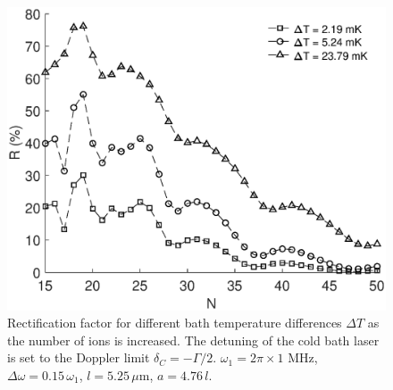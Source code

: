 \begin{figure}
    \includegraphics[width=\linewidth]{Figures/Changing_N.eps}
    \caption{Rectification factor for different bath temperature differences $\Delta T$ as the number of ions is increased. The detuning of the cold bath laser is set to the Doppler limit $\delta_C = - \Gamma / 2$. $\omega_1 = 2 \pi \times 1$ MHz, $\Delta \omega = 0.15 \, \omega_1$, $l = 5.25\,\mu$m, $a = 4.76 \, l$.}
    \label{fig:N_Dependence}
\end{figure}
%
%
